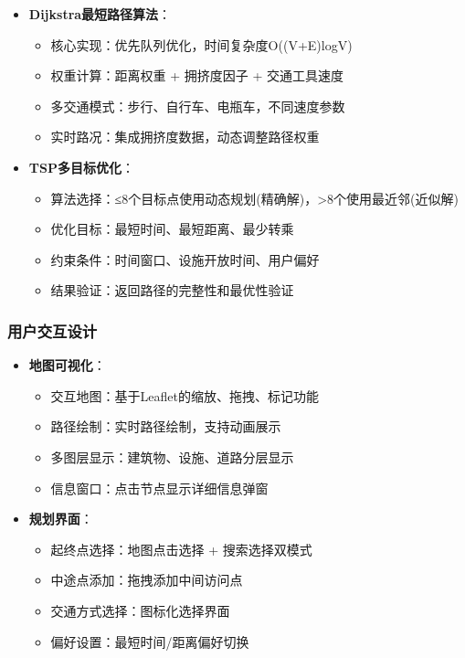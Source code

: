 \documentclass[12pt,a4paper]{article}
\begin{document}
\begin{itemize}
    \item \textbf{Dijkstra最短路径算法}：
    \begin{itemize}
        \item 核心实现：优先队列优化，时间复杂度O((V+E)logV)
        \item 权重计算：距离权重 + 拥挤度因子 + 交通工具速度
        \item 多交通模式：步行、自行车、电瓶车，不同速度参数
        \item 实时路况：集成拥挤度数据，动态调整路径权重
    \end{itemize}
    
    \item \textbf{TSP多目标优化}：
    \begin{itemize}
        \item 算法选择：≤8个目标点使用动态规划(精确解)，>8个使用最近邻(近似解)
        \item 优化目标：最短时间、最短距离、最少转乘
        \item 约束条件：时间窗口、设施开放时间、用户偏好
        \item 结果验证：返回路径的完整性和最优性验证
    \end{itemize}
\end{itemize}

\subsubsection{用户交互设计}

\begin{itemize}
    \item \textbf{地图可视化}：
    \begin{itemize}
        \item 交互地图：基于Leaflet的缩放、拖拽、标记功能
        \item 路径绘制：实时路径绘制，支持动画展示
        \item 多图层显示：建筑物、设施、道路分层显示
        \item 信息窗口：点击节点显示详细信息弹窗
    \end{itemize}
    
    \item \textbf{规划界面}：
    \begin{itemize}
        \item 起终点选择：地图点击选择 + 搜索选择双模式
        \item 中途点添加：拖拽添加中间访问点
        \item 交通方式选择：图标化选择界面
        \item 偏好设置：最短时间/距离偏好切换
    \end{itemize}
\end{itemize}
\end{document}
